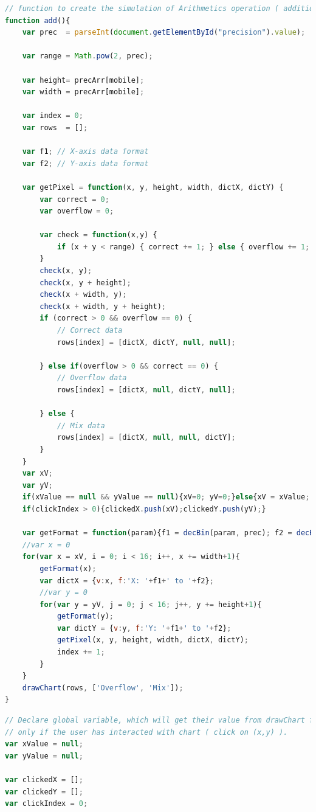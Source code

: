 \documentclass[11pt]{article}
\begin{document}
\begin{lstlisting}[label={lst:add}, language=Javascript, caption={add function},]
// function to create the simulation of Arithmetics operation ( addition )
function add(){
	var prec  = parseInt(document.getElementById("precision").value);

	var range = Math.pow(2, prec);

	var height= precArr[mobile];
	var width = precArr[mobile];

	var index = 0;
	var rows  = [];

	var f1; // X-axis data format 
	var f2; // Y-axis data format

	var getPixel = function(x, y, height, width, dictX, dictY) {
		var correct = 0;
		var overflow = 0;
		
		var check = function(x,y) {
			if (x + y < range) { correct += 1; } else { overflow += 1; }	
		}
		check(x, y);
		check(x, y + height);
		check(x + width, y);
		check(x + width, y + height);
		if (correct > 0 && overflow == 0) {
	    	// Correct data
			rows[index] = [dictX, dictY, null, null];

		} else if(overflow > 0 && correct == 0) {
			// Overflow data
			rows[index] = [dictX, null, dictY, null];

		} else {
			// Mix data
			rows[index] = [dictX, null, null, dictY];
		}
	}
	var xV;
	var yV; 
	if(xValue == null && yValue == null){xV=0; yV=0;}else{xV = xValue; yV = yValue;}
	if(clickIndex > 0){clickedX.push(xV);clickedY.push(yV);}
	
	var getFormat = function(param){f1 = decBin(param, prec); f2 = decBin(param+height, prec);}
	//var x = 0
	for(var x = xV, i = 0; i < 16; i++, x += width+1){
		getFormat(x);
		var dictX = {v:x, f:'X: '+f1+' to '+f2};
		//var y = 0
		for(var y = yV, j = 0; j < 16; j++, y += height+1){
			getFormat(y);
			var dictY = {v:y, f:'Y: '+f1+' to '+f2};
			getPixel(x, y, height, width, dictX, dictY);
			index += 1;
		}
	}
	drawChart(rows, ['Overflow', 'Mix']);
}
\end{lstlisting}

\begin{lstlisting}[label={lst:xyvalue-global}, language=Javascript, caption={Global variables},]
// Declare global variable, which will get their value from drawChart function, 
// only if the user has interacted with chart ( click on (x,y) ). 
var xValue = null;
var yValue = null;

var clickedX = [];
var clickedY = [];
var clickIndex = 0;
\end{lstlisting}
\end{document}
